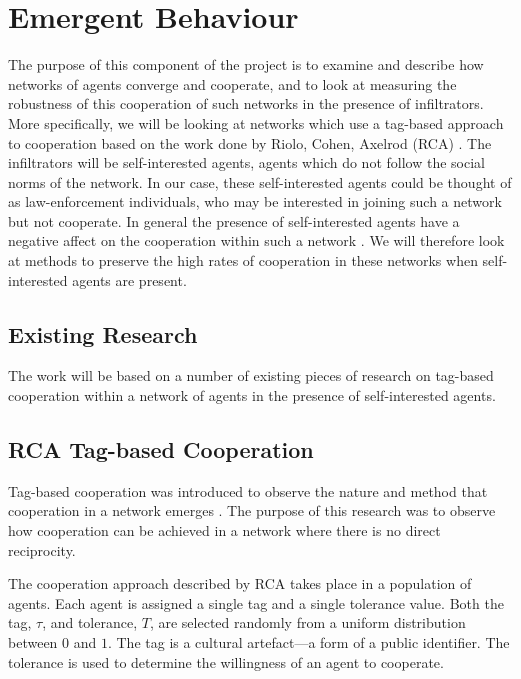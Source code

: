 \section{Emergent Behaviour}

The purpose of this component of the project is to examine and
describe how networks of agents converge and cooperate, and to look at measuring the robustness of this cooperation of such
networks in the presence of infiltrators.  More specifically,
we will be looking at networks which use a tag-based approach to
cooperation based on the work done by Riolo, Cohen, Axelrod (RCA) \cite{rca}.
The infiltrators will be self-interested agents, agents
which do not follow the social norms of the network.  In our case,
these self-interested agents could be thought of as law-enforcement
individuals, who may be interested in joining such a network but not cooperate.
In general the presence of self-interested agents
have a negative affect on the cooperation within such a network \cite{aamas2008}.
We will therefore look at methods to preserve the high rates of cooperation
in these networks when self-interested agents are present.

\subsection{Existing Research}

The work will be based on a number of existing pieces of research on tag-based cooperation within a network of agents in the presence of self-interested agents.

\subsection{RCA Tag-based Cooperation}

Tag-based cooperation was introduced to observe the nature and method that cooperation in a network
emerges \cite{rca}.
The purpose of this research was to observe how cooperation can be achieved in a network where there is no direct reciprocity.

The cooperation approach described by RCA takes place in a population
of agents.  Each agent is assigned a single tag and a single tolerance
value.  Both the tag, $\tau$, and tolerance, $T$, are selected randomly from a
uniform distribution between $0$ and $1$.
The tag is a cultural artefact---a form of a public identifier.
The tolerance is used to determine the willingness of an agent to cooperate.

